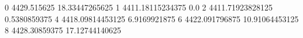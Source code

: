 0 4429.515625 18.33447265625
1 4411.18115234375 0.0
2 4411.71923828125 0.5380859375
4 4418.09814453125 6.9169921875
6 4422.091796875 10.91064453125
8 4428.30859375 17.12744140625
